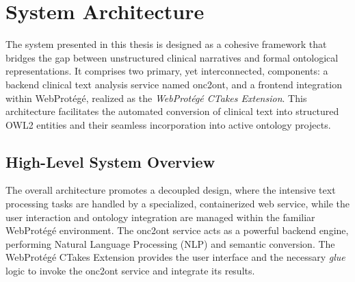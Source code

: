 \section{System Architecture}

The system presented in this thesis is designed as a cohesive framework that bridges the gap between unstructured clinical narratives and formal ontological representations. It comprises two primary, yet interconnected, components: a backend clinical text analysis service named onc2ont, and a frontend integration within WebProtégé, realized as the \textit{WebProtégé CTakes Extension}. This architecture facilitates the automated conversion of clinical text into structured OWL2 entities and their seamless incorporation into active ontology projects.

\subsection{High-Level System Overview}
The overall architecture promotes a decoupled design, where the intensive text processing tasks are handled by a specialized, containerized web service, while the user interaction and ontology integration are managed within the familiar WebProtégé environment. The onc2ont service acts as a powerful backend engine, performing Natural Language Processing (NLP) and semantic conversion. The WebProtégé CTakes Extension provides the user interface and the necessary \textit{glue} logic to invoke the onc2ont service and integrate its results.

